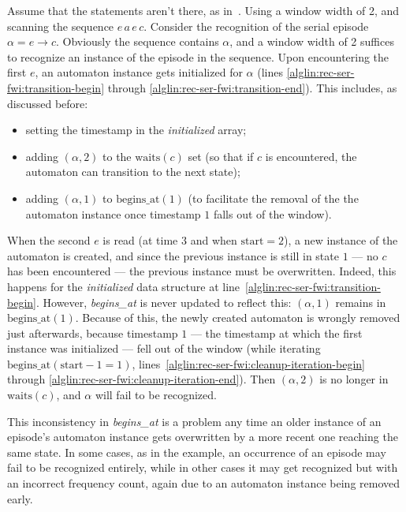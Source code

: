 Assume that the statements aren't there, as in~\cite{mannila1997discovery}. Using a window width of 2, and scanning the sequence $ e \, a \, e \, c $. Consider the recognition of the serial episode $ \alpha = e \to c $. Obviously the sequence contains $ \alpha $, and a window width of 2 suffices to recognize an instance of the episode in the sequence. Upon encountering the first $ e $, an automaton instance gets initialized for $ \alpha $ (lines \ref{alglin:rec-ser-fwi:transition-begin} through \ref{alglin:rec-ser-fwi:transition-end}). This includes, as discussed before:
\begin{itemize}
\item setting the timestamp in the \emph{initialized} array;
\item adding $ (\alpha, 2) $ to the $ \text{waits}(c) $ set (so that if $ c $ is encountered, the automaton can transition to the next state);
\item adding $ (\alpha, 1) $ to $ \text{begins\_at}(1) $ (to facilitate the removal of the the automaton instance once timestamp $ 1 $ falls out of the window).
\end{itemize}

When the second $ e $ is read (at time $ 3 $ and when $ \text{start} = 2 $), a new instance of the automaton is created, and since the previous instance is still in state $ 1 $ --- no $ c $ has been encountered --- the previous instance must be overwritten. Indeed, this happens for the \emph{initialized} data structure at line~\ref{alglin:rec-ser-fwi:transition-begin}. However, \emph{begins\_at} is never updated to reflect this: $ (\alpha, 1) $ remains in $ \text{begins\_at}(1) $. Because of this, the newly created automaton is wrongly removed just afterwards, because timestamp $ 1 $ --- the timestamp at which the first instance was initialized --- fell out of the window (while iterating $ \text{begins\_at}(\text{start} - 1 = 1) $, lines~\ref{alglin:rec-ser-fwi:cleanup-iteration-begin} through \ref{alglin:rec-ser-fwi:cleanup-iteration-end}). Then $ (\alpha, 2) $ is no longer in $ \text{waits}(c) $, and $ \alpha $ will fail to be recognized.

This inconsistency in \emph{begins\_at} is a problem any time an older instance of an episode's automaton instance gets overwritten by a more recent one reaching the same state. In some cases, as in the example, an occurrence of an episode may fail to be recognized entirely, while in other cases it may get recognized but with an incorrect frequency count, again due to an automaton instance being removed early.

